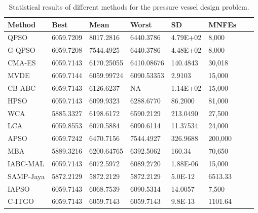 
\begin{table*}[tp]
    \tiny
    \begin{center}
    
    \begin{tabular}{ P{2.0cm} P{2.0cm} P{2.0cm} P{2.0cm} P{2.0cm} P{2.0cm} P{2.0cm} P{2.0cm}  }
    \hline
    \textbf{Method} & \textbf{Best} & \textbf{Mean} & \textbf{Worst} & \textbf{SD} & \textbf{MNFEs} \\
    \hline
    
    QPSO & 6059.7209 & 8017.2816 & 6440.3786 & 4.79E+02 & 8,000 \\
    G-QPSO & 6059.7208 & 7544.4925 & 6440.3786 & 4.48E+02 & 8,000 \\
    CMA-ES & 6059.7143 & 6170.25055 & 6410.08676 & 140.4843 & 30,018 \\
    MVDE & 6059.7144 & 6059.99724 & 6090.53353 & 2.9103 & 15,000 \\ 
    CB-ABC & 6059.7143 & 6126.6237 & NA & 1.14E+02 & 15,000 \\
    HPSO & 6059.7143 & 6099.9323 & 6288.6770 & 86.2000 & 81,000 \\
    WCA & 5885.3327 & 6198.6172 & 6590.2129 & 213.0490 & 27,500 \\
    LCA & 6059.8553 & 6070.5884 & 6090.6114 & 11.37534 & 24,000 \\
    APSO & 6059.7242 & 6470.7156 & 7544.4927 & 326.9688 & 200,000 \\
    MBA & 5889.3216 & 6200.64765 & 6392.5062 & 160.34 & 70,650 \\    
    IABC-MAL & 6059.7143 & 6072.5972 & 6089.2720 & 1.88E-06 & 15,000 \\
    SAMP-Jaya & 5872.2129 & 5872.2129 & 5872.2129 & 5.0E-12 & 6513.33 \\    
    IAPSO & 6059.7143 & 6068.7539 & 6090.5314 & 14.0057 & 7,500 \\
    C-ITGO & 6059.7143 & 6059.7143 & 6059.7143 & 9.8E-13 & 1101.64 \\
    
    \hline
    \end{tabular}
    \end{center}
    \vspace*{-6mm}
    \caption{Statistical results of different methods for the pressure vessel design problem. \\[1em]}
    \label{tab:PV}
    \end{table*}
    
    